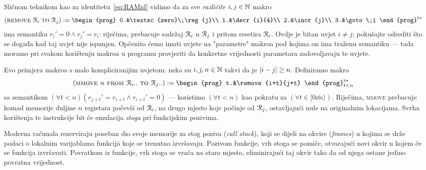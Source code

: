 \noindent
Sličnom tehnikom kao za identitetu~\eqref{eq:RAMid} vidimo da za sve \emph{različite} $i,j\in{\mathbb N}$ makro
\begin{equation}
    (\remove{i}{j}):=\begin{prog}
    0.&\textsc{zero}\;\reg{j}\\
    1.&\decr{i}{4}\\
    2.&\incr{j}\\
    3.&\goto\;1
    \end{prog}^{\flat*}
\end{equation}
ima semantiku $r_i'=0\land r_j'=r_i$: riječima, prebacuje sadržaj $\mathcal R_{i}$ u $\mathcal R_{j}$ i pritom resetira $\mathcal R_{i}$. Ovdje je bitan uvjet $i\ne j$; pokušajte odrediti što se događa kad taj uvjet nije ispunjen. Općenito ćemo imati uvjete na "parametre" makroa pod kojima on ima traženu semantiku --- tada moramo pri svakom korištenju makroa u programu provjeriti da konkretne vrijednosti parametara zadovoljavaju te uvjete.

Evo primjera makroa s malo kompliciranijim uvjetom: neka su $i,j,n\in{\mathbb N}$ takvi da je $\lvert i-j\rvert\ge n$. Definiramo makro
\begin{equation}
    (\textsc{mmove $n$ from $\reg{i}..$ to $\reg{j}..$}):=\begin{prog}
    t.&\remove{i+t}{j+t}
    \end{prog}_{t<n}^{\flat*}
\end{equation}
sa semantikom $(\forall t<n)(r_{j+t}'=r_{i+t}\land r_{i+t}'=0)$ --- koristimo $(\forall t<n)$ kao pokratu za $(\forall t\in[0\dd n\rangle)$. Riječima, \textsc{mmove} prebacuje komad memorije duljine $n$ registara počevši od $\mathcal R_{i}$, na drugo mjesto koje počinje od $\mathcal R_{j}$, ostavljajući nule na originalnim lokacijama. Svrha korištenja te instrukcije bit će emulacija \emph{stoga} pri funkcijskim pozivima.

Moderna računala rezerviraju poseban dio svoje memorije za stog poziva (\emph{call stack}), koji se dijeli na okvire (\emph{frames}) u kojima se drže podaci o lokalnim varijablama funkcij\=a koje se trenutno izvršavaju. Pozivom funkcije, vrh stoga se pomiče, otvarajući novi okvir u kojem će se funkcija izvršavati. Povratkom iz funkcije, vrh stoga se vraća na staro mjesto, eliminirajući taj okvir tako da od njega ostane jedino povratna vrijednost.

